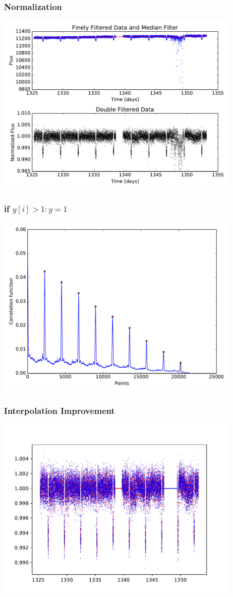 \documentclass[notes]{beamer}
\begin{document}
\begin{frame}
\frametitle{Normalization}
\centering
\includegraphics[width=0.9\textwidth]{../figures/2019-1-15_16:2:14_normcurve_lightcurve_TIC38846515.pdf}
\end{frame}

\begin{frame}
\frametitle{if $y[i]>1: y=1$}
\centering
\includegraphics[width=0.9\textwidth]{../figures/2018-11-27_14:45:48_peaks_fig0.pdf}
\end{frame}

\begin{frame}
\frametitle{Interpolation Improvement}
\centering
\includegraphics[width=0.9\textwidth]{../figures/2019-1-15_11:5:15_intercurve_TIC38846515.pdf}
\end{frame}
\end{document}
